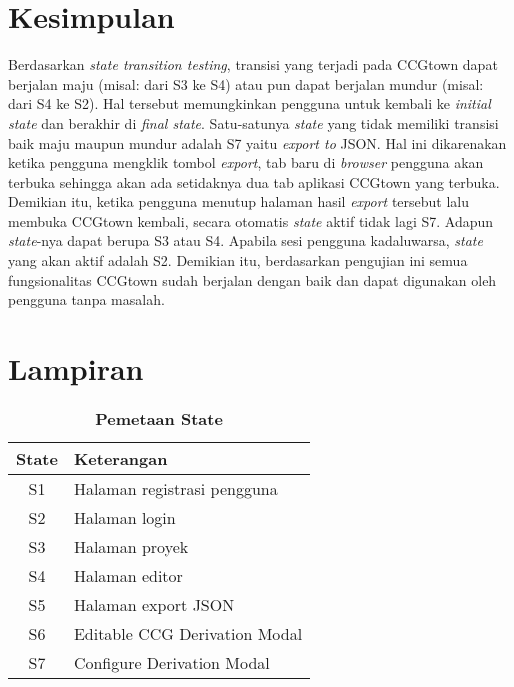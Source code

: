 \section{Kesimpulan}

Berdasarkan \textit{state transition testing}, transisi yang terjadi pada CCGtown dapat berjalan
maju (misal: dari S3 ke S4) atau pun dapat berjalan mundur (misal: dari S4 ke S2). Hal tersebut
memungkinkan pengguna untuk kembali ke \textit{initial state} dan berakhir di \textit{final state}.
Satu-satunya \textit{state} yang tidak memiliki transisi baik maju maupun mundur adalah S7
yaitu \textit{export to} JSON. Hal ini dikarenakan ketika pengguna mengklik tombol \textit{export},
tab baru di \textit{browser} pengguna akan terbuka sehingga akan ada setidaknya dua tab aplikasi
CCGtown yang terbuka. Demikian itu, ketika pengguna menutup halaman hasil \textit{export} tersebut
lalu membuka CCGtown kembali, secara otomatis \textit{state} aktif tidak lagi S7. Adapun
\textit{state}-nya dapat berupa S3 atau S4. Apabila sesi pengguna kadaluwarsa, \textit{state} yang
akan aktif adalah S2. Demikian itu, berdasarkan pengujian ini semua fungsionalitas CCGtown sudah
berjalan dengan baik dan dapat digunakan oleh pengguna tanpa masalah.
 





\section*{Lampiran}

\begin{table}
  \caption{\textbf{Pemetaan State}}
  \label{table:state-map}
  \centering
  \begin{tabular}{| c | l |}
    \hline
    \textbf{State} & \textbf{Keterangan} \\ [0.5ex]
    \hline
    S1 & Halaman registrasi pengguna \\
    S2 & Halaman login \\
    S3 & Halaman proyek \\
    S4 & Halaman editor \\
    S5 & Halaman export JSON \\
    S6 & Editable CCG Derivation Modal \\
    S7 & Configure Derivation Modal \\ [1ex]
    \hline
  \end{tabular}
\end{table}

